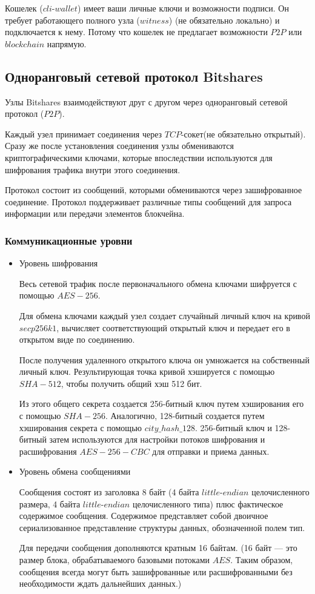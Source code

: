 \documentclass[a4paper, 14pt]{extarticle}
\begin{document}
Кошелек ($cli$-$wallet$) имеет ваши личные ключи и возможности подписи. Он требует работающего полного узла ($witness$) (не обязательно локально) и подключается к нему. Потому что кошелек не предлагает возможности $P2P$ или $blockchain$ напрямую.

\subsection{Одноранговый сетевой протокол Bitshares}
Узлы Bitshares взаимодействуют друг с другом через одноранговый сетевой протокол ($P2P$).

Каждый узел принимает соединения через $TCP$-сокет(не обязательно открытый). Сразу же после установления соединения узлы обмениваются криптографическими ключами, которые впоследствии используются для шифрования трафика внутри этого соединения.

Протокол состоит из сообщений, которыми обмениваются через зашифрованное соединение. Протокол поддерживает различные типы сообщений для запроса информации или передачи элементов блокчейна.

\subsubsection{Коммуникационные уровни}

\begin{itemize}
    \item Уровень шифрования

    Весь сетевой трафик после первоначального обмена ключами шифруется с помощью $AES-256$.

    Для обмена ключами каждый узел создает случайный личный ключ на кривой $secp256k1$, вычисляет соответствующий открытый ключ и передает его в открытом виде по соединению.

    После получения удаленного открытого ключа он умножается на собственный личный ключ. Результирующая точка кривой хэшируется с помощью $SHA-512$, чтобы получить общий хэш 512 бит.

    Из этого общего секрета создается 256-битный ключ путем хэширования его с помощью $SHA-256$. Аналогично, 128-битный создается путем хэширования секрета с помощью $city\_hash\_128$. 256-битный ключ и 128-битный затем используются для настройки потоков шифрования и расшифрования $AES-256-CBC$ для отправки и приема данных.
    \item Уровень обмена сообщениями

    Сообщения состоят из заголовка 8 байт (4 байта $little$-$endian$ целочисленного размера, 4 байта $little$-$endian$ целочисленного типа) плюс фактическое содержимое сообщения. Содержимое представляет собой двоичное сериализованное представление структуры данных, обозначенной полем тип.

    Для передачи сообщения дополняются кратным 16 байтам. (16 байт --- это размер блока, обрабатываемого базовыми потоками $AES$. Таким образом, сообщения всегда могут быть зашифрованные или расшифрованными без необходимости ждать дальнейших данных.)
\end{itemize}
\end{document}
